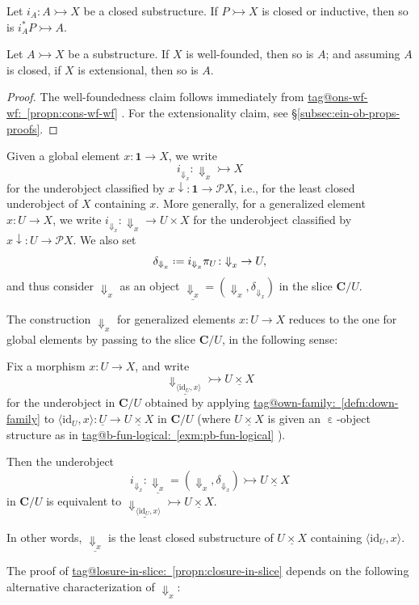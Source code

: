 \documentclass{amsart}
\makeatletter
\newcommand\bC{\mathbf{C}}
\newcommand\br[1]{\langle{}#1\rangle{}}
\newcommand\defeq{\mathrel{\vcenter{\baselineskip0.5ex \lineskiplimit0pt \hbox{.}\hbox{.}}} =}
\newcommand\dwn{\mathpunct{\downarrow}}
\newcommand\Dwn{{\Downarrow}}
\newcommand\ein{\mathrel{\varepsilon}}
\newcommand\id{\mathrm{id}}
\newcommand\pow{\mathcal{P}}
\newcommand\tm{\mathbf{1}}
\newcommand\tto{\rightarrowtail}
\newcommand\und[1]{\underline{#1}}
\newcommand\unein{{\ein}}
\newcommand\prooflabel[1]{\gdef\proof@label{#1}}
\def\proof@label{}
\newcommand\tagword[1]{\csname tag@#1\endcsname}
\def\label@tag#1:#2\@nil{#1}
\newcommand\labeltag[1]{\label@tag#1:\@nil}
\newcommand\jref[1]{%
  \texorpdfstring%
    {\hyperref[#1]{\tagword{\labeltag{#1}}~\ref*{#1}}}%
    {\tagword{\labeltag{#1}}~\ref*{#1}}%
}
\theoremstyle{definition}
\theoremstyle{remark}
\theoremstyle{plainwithref}
\makeatother
\begin{document}
\prooflabel{proof:sub-clo-induc}
\begin{propn} \label{propn:sub-clo-induc}
  Let \( i_A \colon A \tto X \) be a closed substructure.
  If \( P \tto X \) is closed or inductive, then so is \( i_A^* P \tto A \).
\end{propn}

\begin{propn} \label{propn:sub-ewf}
  Let \( A \tto X \) be a substructure.
  If \( X \) is well-founded, then so is \( A \); and assuming \( A \) is closed, if \( X \) is extensional, then so is \( A \).
\end{propn}

\begin{proof}
  The well-foundedness claim follows immediately from \jref{propn:cons-wf-wf}.
  For the extensionality claim, see \hyperref[proof:sub-ewf]{\S\ref*{subsec:ein-ob-props-proofs}}.
\end{proof}

\begin{defn} \label{defn:down-family}
  Given a global element \( x \colon \tm \to X \), we write
  \[
    i_{\Dwn_x} \colon \Dwn_x \tto X
  \]
for the underobject classified by \( x \dwn \colon \tm \to \pow X \), i.e., for the least closed underobject of \( X \) containing \( x \).
  More generally, for a generalized element \( x \colon U \to X \), we write \( i_{\Dwn_x} \colon \Dwn_x \to U \times X \) for the underobject classified by \( x \dwn \colon U \to \pow X \).
  We also set
  \[
    \delta_{\Dwn_x} \defeq i_{\Dwn_x} \pi_U \colon \Dwn_x \to U,
  \]
  and thus consider \( \Dwn_x \) as an object \( \und{\Dwn_x} = (\Dwn_x, \delta_{\Dwn_x}) \) in the slice \( \bC / U \).
\end{defn}

The construction \( \Dwn_x \) for generalized elements \( x \colon U \to X \) reduces to the one for global elements by passing to the slice \( \bC / U \), in the following sense:
\prooflabel{proof:closure-in-slice}
\begin{propn} \label{propn:closure-in-slice}
  Fix a morphism \( x \colon U \to X \), and write
  \[
    \und{\Dwn_{\br{\id_U, x}}} \tto \und{U \times X}
  \]
  for the underobject in \( \bC / U \) obtained by applying \jref{defn:down-family} to \( \br{\id_U, x} \colon \und U \to \und{U \times X} \) in \( \bC / U \) (where \( \und{U \times X} \) is given an \( \unein \)-object structure as in \jref{exm:pb-fun-logical}).

  Then the underobject
  \[
    i_{\Dwn_x} \colon \und{\Dwn_x} = (\Dwn_x, \delta_{\Dwn_x}) \tto \und{U \times X}
  \]
  in \( \bC / U \) is equivalent to \( \und{\Dwn_{\br{\id_U, x}}} \tto \und{U \times X} \).

  In other words, \( \und{\Dwn_x} \) is the least closed substructure of \( \und{U \times X} \) containing \( \br{\id_U, x} \).
\end{propn}
The proof of \jref{propn:closure-in-slice} depends on the following alternative characterization of \( \Dwn_x \):
\end{document}
